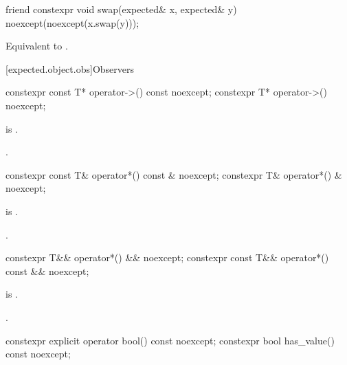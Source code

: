 %
\begin{itemdecl}
friend constexpr void swap(expected& x, expected& y) noexcept(noexcept(x.swap(y)));
\end{itemdecl}

\begin{itemdescr}
\pnum
\effects
Equivalent to .
\end{itemdescr}

[expected.object.obs]{Observers}

%
\begin{itemdecl}
constexpr const T* operator->() const noexcept;
constexpr T* operator->() noexcept;
\end{itemdecl}

\begin{itemdescr}
\pnum
\hardexpects
{} is .

\pnum
\returns
{}.
\end{itemdescr}

%
\begin{itemdecl}
constexpr const T& operator*() const & noexcept;
constexpr T& operator*() & noexcept;
\end{itemdecl}

\begin{itemdescr}
\pnum
\hardexpects
{} is .

\pnum
\returns
{}.
\end{itemdescr}

%
\begin{itemdecl}
constexpr T&& operator*() && noexcept;
constexpr const T&& operator*() const && noexcept;
\end{itemdecl}

\begin{itemdescr}
\pnum
\hardexpects
{} is .

\pnum
\returns
{}.
\end{itemdescr}

%
%
\begin{itemdecl}
constexpr explicit operator bool() const noexcept;
constexpr bool has_value() const noexcept;
\end{itemdecl}

